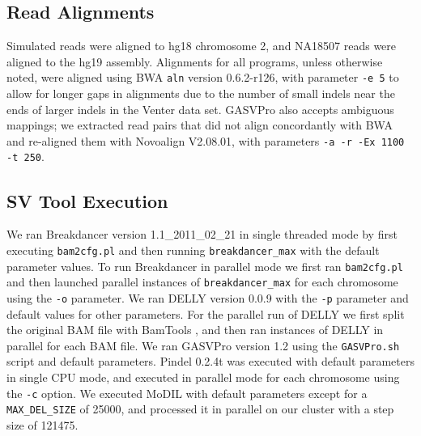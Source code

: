\documentclass[11pt]{article}
\begin{document}
\subsection{Read Alignments}
Simulated reads were aligned to hg18 chromosome 2, and NA18507 reads were aligned to the hg19 assembly. Alignments for all programs, unless otherwise noted, were aligned using BWA \autocite{Li:2009p836} \texttt{aln} version 0.6.2-r126, with parameter \texttt{-e 5} to allow for longer gaps in alignments due to the number of small indels near the ends of larger indels in the Venter data set. GASVPro also accepts ambiguous mappings; we extracted read pairs that did not align concordantly with BWA and re-aligned them with Novoalign V2.08.01, with parameters \texttt{-a -r -Ex 1100 -t 250}. 

\subsection{SV Tool Execution}
We ran Breakdancer version 1.1\_2011\_02\_21 in single threaded mode by first executing \texttt{bam2cfg.pl} and then running \texttt{breakdancer\_max} with the default parameter values.  To run Breakdancer in parallel mode we first ran \texttt{bam2cfg.pl} and then launched parallel instances of \texttt{breakdancer\_max} for each chromosome using the \texttt{-o} parameter. We ran DELLY version 0.0.9 with the \texttt{-p} parameter and default values for other parameters. For the parallel run of DELLY we first split the original BAM file with BamTools \autocite{Barnett:2011hm}, and then ran instances of DELLY in parallel for each BAM file. We ran GASVPro version 1.2 using the \texttt{GASVPro.sh} script and default parameters. Pindel 0.2.4t was executed with default parameters in single CPU mode, and executed in parallel mode for each chromosome using the \texttt{-c} option. We executed MoDIL with default parameters except for a \texttt{MAX\_DEL\_SIZE} of 25000, and processed it in parallel on our cluster with a step size of 121475.
\end{document}
